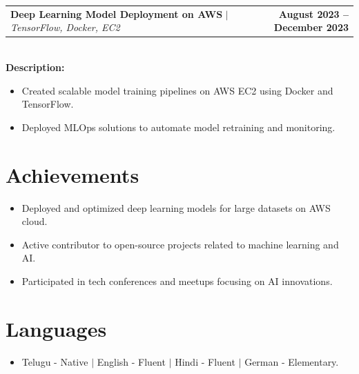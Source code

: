 \documentclass[letterpaper,11pt]{article}
\makeatletter
\newcommand{\resumeProjectHeading}[2]{
    \item
    \begin{tabular*}{1.001\textwidth}{l@{\extracolsep{\fill}}r}
      \small#1 & \textbf{\small #2}\\
    \end{tabular*}\vspace{-7pt}
}
\makeatother
\begin{document}
\resumeProjectHeading
{\textbf{Deep Learning Model Deployment on AWS} $|$ \emph{TensorFlow, Docker, EC2}}{August 2023 -- December 2023} \\
\vspace{6pt}
\textbf{Description:}
\begin{itemize}[leftmargin=0.15in, label={}]
\item Created scalable model training pipelines on AWS EC2 using Docker and TensorFlow.
\item Deployed MLOps solutions to automate model retraining and monitoring.
\end{itemize}

\section{Achievements}
\begin{itemize}[leftmargin=0.15in, label={}]
\item Deployed and optimized deep learning models for large datasets on AWS cloud.
\item Active contributor to open-source projects related to machine learning and AI.
\item Participated in tech conferences and meetups focusing on AI innovations.
\end{itemize}

\section*{Languages}
\begin{itemize}
  \item Telugu - Native $|$ English - Fluent $|$ Hindi - Fluent $|$ German - Elementary.
\end{itemize}
\end{document}
